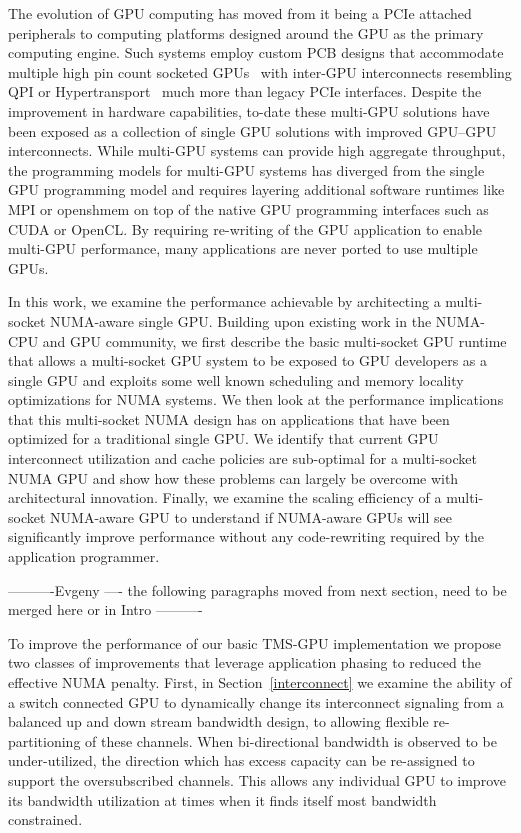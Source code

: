 The evolution of GPU computing has moved from it being a PCIe attached peripherals 
to computing platforms designed around the GPU as the primary computing engine. 
Such systems employ custom PCB designs that accommodate multiple high pin count socketed 
GPUs~\cite{DGX} with inter-GPU interconnects resembling QPI or 
Hypertransport~\cite{INTELQPI,AMDHT} much more than legacy PCIe interfaces.  
Despite the improvement in hardware capabilities, to-date these multi-GPU 
solutions have been exposed as a collection of single GPU solutions with improved GPU--GPU 
interconnects. While multi-GPU systems can provide high aggregate throughput, 
the programming models for multi-GPU systems has diverged from the single GPU 
programming model and requires layering additional software runtimes like MPI 
or openshmem on top of the native GPU programming interfaces such as CUDA or OpenCL.
By requiring re-writing of the GPU application to enable multi-GPU performance, 
many applications are never ported to use multiple GPUs.

In this work, we examine the performance achievable by architecting a 
multi-socket NUMA-aware single GPU.  Building upon existing work in the 
NUMA-CPU and GPU community, we first describe the basic multi-socket GPU runtime 
that allows a multi-socket GPU system to be exposed to GPU developers as a 
single GPU and exploits some well known scheduling and memory locality 
optimizations for NUMA systems. We then look at the performance implications 
that this multi-socket NUMA design has on applications that have been optimized 
for a traditional single GPU.  We identify that current GPU interconnect 
utilization and cache policies are sub-optimal for a multi-socket NUMA GPU and 
show how these problems can largely be overcome with architectural innovation.  
Finally, we examine the scaling efficiency of a multi-socket NUMA-aware GPU to 
understand if NUMA-aware GPUs will see significantly improve performance  
without any code-rewriting required by the application programmer.


----------Evgeny ---- 
the following paragraphs moved from next section, need to be merged here or in
Intro ----------

To improve the performance of our
basic TMS-GPU implementation we propose two classes of improvements that 
leverage application phasing to reduced the effective NUMA penalty.  First, in 
Section~\ref{interconnect} we examine the ability of a switch connected GPU to 
dynamically change its interconnect signaling from a balanced up and down 
stream bandwidth design, to allowing flexible re-partitioning of these channels.  
When bi-directional bandwidth is observed to be under-utilized, the direction 
which has excess capacity can be re-assigned to support the oversubscribed 
channels. This allows any individual GPU to improve its bandwidth utilization at 
times when it finds itself most bandwidth constrained.

